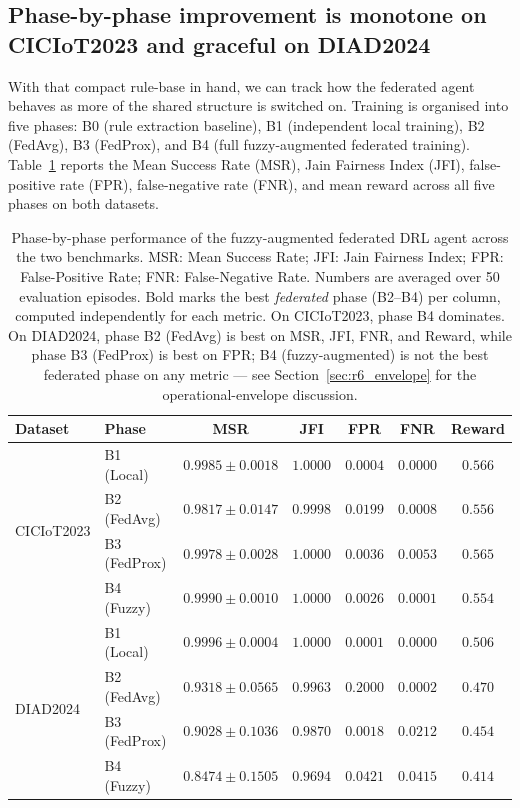 \documentclass[ai,article,submit,moreauthors,pdftex]{Definitions/mdpi}
\newcommand{\rev}[1]{#1}
\begin{document}
\subsection{Phase-by-phase improvement is monotone on CICIoT2023 and
graceful on DIAD2024}\label{sec:r3_phases}

With that compact rule-base in hand, we can track how the federated
agent behaves as more of the shared structure is switched on.
Training is organised into five phases: B0 (rule extraction
baseline), B1 (independent local training), B2 (FedAvg), B3
(FedProx), and B4 (full fuzzy-augmented federated training).
Table~\ref{tab:phase_msr} reports the Mean Success Rate (MSR), Jain
Fairness Index (JFI), false-positive rate (FPR), false-negative
rate (FNR), and mean reward across all five phases on both
datasets.

\begin{table}[!htbp]
  \centering
  \caption{Phase-by-phase performance of the fuzzy-augmented federated
  DRL agent across the two benchmarks. MSR: Mean Success Rate; JFI: Jain
  Fairness Index; FPR: False-Positive Rate; FNR: False-Negative Rate.
  Numbers are averaged over 50 evaluation episodes. \rev{Bold marks the best \emph{federated} phase (B2--B4) per column, computed independently for each metric. On CICIoT2023, phase B4 dominates. On DIAD2024, phase B2 (FedAvg) is best on MSR, JFI, FNR, and Reward, while phase B3 (FedProx) is best on FPR; B4 (fuzzy-augmented) is not the best federated phase on any metric --- see Section~\ref{sec:r6_envelope} for the operational-envelope discussion.}}\label{tab:phase_msr}
  \small
  \begin{tabular}{@{}llccccc@{}}
    \toprule
    \textbf{Dataset} & \textbf{Phase} & \textbf{MSR} & \textbf{JFI} & \textbf{FPR} & \textbf{FNR} & \textbf{Reward} \\
    \midrule
    \multirow{4}{*}{CICIoT2023}
      & B1 (Local)   & $0.9985\pm0.0018$ & $1.0000$ & $0.0004$ & $0.0000$ & $0.566$ \\
      & B2 (FedAvg)  & $0.9817\pm0.0147$ & $0.9998$ & $0.0199$ & $0.0008$ & $0.556$ \\
      & B3 (FedProx) & $0.9978\pm0.0028$ & $1.0000$ & $0.0036$ & $0.0053$ & $0.565$ \\
      & B4 (Fuzzy)   & $\mathbf{0.9990\pm0.0010}$ & $\mathbf{1.0000}$ & $\mathbf{0.0026}$ & $\mathbf{0.0001}$ & $0.554$ \\
    \midrule
    \multirow{4}{*}{DIAD2024}
      & B1 (Local)   & $0.9996\pm0.0004$ & $1.0000$ & $0.0001$ & $0.0000$ & $0.506$ \\
      & B2 (FedAvg)  & \rev{$\mathbf{0.9318\pm0.0565}$} & \rev{$\mathbf{0.9963}$} & $0.2000$ & \rev{$\mathbf{0.0002}$} & \rev{$\mathbf{0.470}$} \\
      & B3 (FedProx) & \rev{$0.9028\pm0.1036$} & \rev{$0.9870$} & \rev{$\mathbf{0.0018}$} & \rev{$0.0212$} & \rev{$0.454$} \\
      & B4 (Fuzzy)   & \rev{$0.8474\pm0.1505$} & \rev{$0.9694$} & \rev{$0.0421$} & \rev{$0.0415$} & \rev{$0.414$} \\
    \bottomrule
  \end{tabular}
\end{table}
\end{document}

